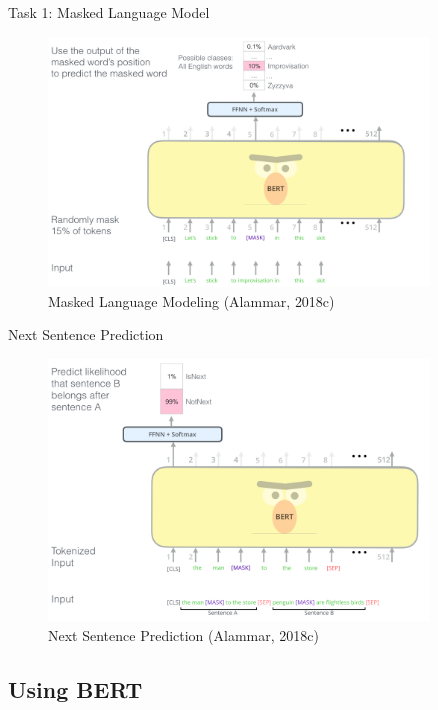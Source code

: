 \documentclass[10pt]{beamer}
\begin{document}
\begin{frame}{Task 1: Masked Language Model}

\begin{figure}[h]
\centering
\includegraphics[width=0.9\textwidth]{fig/BERT-language-modeling-masked-lm.png}
\caption{Masked Language Modeling (Alammar, 2018c)}
\end{figure}

\end{frame}


\begin{frame}{Next Sentence Prediction}

\begin{figure}[h]
\centering
\includegraphics[width=0.9\textwidth]{fig/bert-next-sentence-prediction.png}
\caption{Next Sentence Prediction (Alammar, 2018c)}
\end{figure}

\end{frame}



\subsection{Using BERT}
\end{document}
